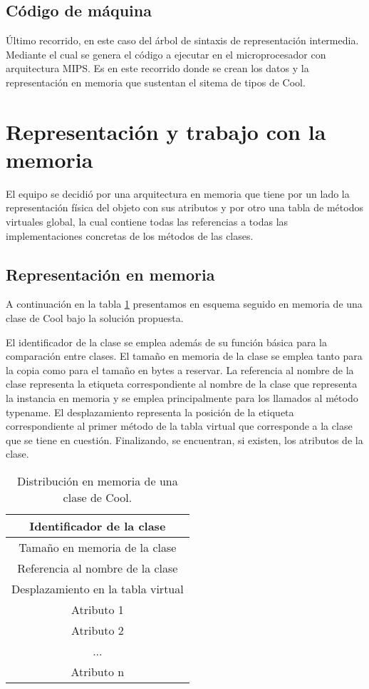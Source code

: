 \documentclass[a4paper,10pt,twocolumn]{article}
\begin{document}
	\subsection{Código de máquina}
	\'Ultimo recorrido, en este caso del árbol de sintaxis de representación intermedia. Mediante el cual se genera el código a ejecutar en el microprocesador con arquitectura MIPS. Es en este recorrido donde se crean los datos y la representación en memoria que sustentan el sitema de tipos de Cool.
	
	
\section{Representación y trabajo con la memoria}

El equipo se decidió por una arquitectura en memoria que tiene por un lado la representación física del objeto con sus atributos y por otro una tabla de métodos virtuales global, la cual contiene todas las referencias a todas las implementaciones concretas de los métodos de las clases.

\subsection{Representación en memoria}

A continuación en la tabla \ref{fig:memory} presentamos en esquema seguido en memoria de una clase de Cool bajo la solución propuesta.

El identificador de la clase se emplea además de su función básica para la comparación entre clases. El tamaño en memoria de la clase se emplea tanto para la copia como para el tamaño en bytes a reservar. La referencia al nombre de la clase representa la etiqueta correspondiente al nombre de la clase que representa la instancia en memoria y se emplea principalmente para los llamados al método typename. El desplazamiento representa la posición de la etiqueta correspondiente al primer método de la tabla virtual que corresponde a la clase que se tiene en cuestión. Finalizando, se encuentran, si existen, los atributos de la clase.

\begin{table}[h]
	\centering
	\begin{tabular}{|c|}
		\hline
		Identificador de la clase \\
		\hline
		Tamaño en memoria de la clase  \\
		\hline
		Referencia al nombre de la clase \\
		\hline
		Desplazamiento en la tabla virtual  \\
		\hline
		Atributo 1 \\
		\hline
		Atributo 2  \\
		\hline
		...  \\
		\hline
		Atributo n \\
		\hline
	\end{tabular}
	\caption{Distribución en memoria de una clase de Cool.}
	\label{fig:memory}
	
\end{table}
\end{document}
